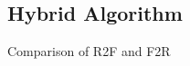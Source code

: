 \documentclass{beamer}
\begin{document}
\subsection{Hybrid Algorithm}
\begin{frame}{Comparison of R2F and F2R}
\begin{figure}[H]
	\centering
	\subfigure[$p = 8$, execution time]{
}
\end{figure}
\end{frame}
\end{document}
